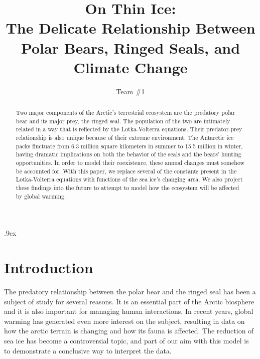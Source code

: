 \documentclass[reqno,11pt]{amsart}
\begin{document}
\parskip.9ex

\title[On Thin Ice]
{On Thin Ice:\\ The Delicate Relationship Between\\ Polar Bears, Ringed Seals, and Climate Change}
\author[Team \#1]{Team \#1}
\keywords{}

\begin{abstract}
Two major components of the Arctic’s terrestrial ecosystem are the predatory polar bear and its major prey, the ringed seal. The population of the two are intimately related in a way that is reflected by the Lotka-Volterra equations. Their predator-prey relationship is also unique because of their extreme environment. The Antarctic ice packs fluctuate from 6.3 million square kilometers in summer to 15.5 million in winter, having dramatic implications on both the behavior of the seals and the bears’ hunting opportunities.  In order to model their coexistence, these annual changes must somehow be accounted for. With this paper, we replace several of the constants present in the Lotka-Volterra equations with functions of the sea ice’s changing area. We also project these findings into the future to attempt to model how the ecosystem will be affected by global warming.
\end{abstract}

\maketitle

\section{Introduction}
\label{sec:introduction}
The predatory relationship between the polar bear and the ringed seal has been a subject of study for several reasons. It is an essential part of the Arctic biosphere and it is also important for managing human interactions.\cite{Stirling} In recent years, global warming has generated even more interest on the subject, resulting in data on how the arctic terrain is changing and how its fauna is affected.\cite{Ice} The reduction of sea ice has become a controversial topic, and part of our aim with this model is to demonstrate a conclusive way to interpret the data.
\end{document}
